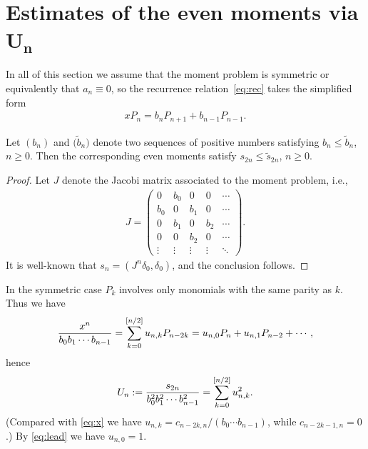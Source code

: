 \section[Estimates of the even moments via $U_n$]{Estimates of the even moments via $\boldsymbol{U_n}$}\label{section3}
In all of this section we assume that the moment problem is symmetric or equivalently that $a_n\equiv 0$, so the recurrence relation~\eqref{eq:rec} takes the simplified form
\begin{gather}\label{eq:recsym}
xP_n=b_nP_{n+1}+b_{n-1}P_{n-1}.
\end{gather}

\begin{prop}\label{thm:increasofbn}Let $(b_n)$ and $\big(\tilde{b}_n\big)$ denote two sequences of positive numbers satisfying $b_n\le \tilde{b}_n$, $n\ge 0$. Then the corresponding even moments satisfy $s_{2n}\le \tilde{s}_{2n}$, $n\ge 0$.
\end{prop}

\begin{proof}Let $J$ denote the Jacobi matrix associated to the moment problem, i.e.,
\begin{gather}\label{eq:Jacobimat}
J=\begin{pmatrix} 0 & b_0 & 0 & 0 & \cdots\\
 b_0 & 0 & b_1 & 0 & \cdots\\
 0 & b_1 & 0 & b_2 & \cdots\\
 0 & 0 & b_2 & 0 & \cdots\\
 \vdots & \vdots & \vdots & \vdots & \ddots
\end{pmatrix}.
\end{gather}
It is well-known that $s_n=(J^n\delta_0,\delta_0)$, and the conclusion follows.
\end{proof}

In the symmetric case $P_k$ involves only monomials with the same parity as $k$. Thus we have
 \begin{gather}\label{eq:u0}
{x^n\over b_0b_1\cdots b_{n-1}}=\sum_{k=0}^{[n/2]}u_{n,k}P_{n-2k}=u_{n,0}P_n+u_{n,1}P_{n-2}+\cdots,
\end{gather}
 hence
 \begin{gather}\label{eq:u1}
U_n:= {s_{2n}\over b_0^2b_1^2\cdots b_{n-1}^2}=\sum_{k=0}^{[n/2]}u_{n,k}^2.
 \end{gather}
(Compared with \eqref{eq:x} we have $u_{n,k}=c_{n-2k,n}/(b_0\cdots b_{n-1})$, while $c_{n-2k-1,n}=0$.) By \eqref{eq:lead} we have $u_{n,0}=1$.


